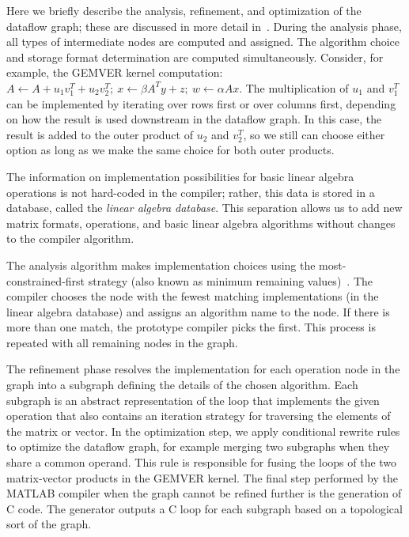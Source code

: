 \documentclass[runningheads]{llncs}
\begin{document}
Here we briefly describe the analysis, refinement, and optimization of the
dataflow graph; these are discussed in more detail in~\cite{Siek}. 
During the analysis phase, all types of intermediate nodes are computed and
assigned. The algorithm choice and storage format determination are computed
simultaneously.  Consider, for example, the GEMVER kernel computation:   
$A \gets A + u_1 v_1^T + u_2 v_2^T;~
  x \gets \beta A^T y + z;~
  w \gets \alpha A x$.
The multiplication of $u_1$ and $v_1^T$ can be implemented by iterating over 
rows first or over columns first, depending on how the result is used
downstream in the dataflow graph.  In this case, the result is added to the
outer product of $u_2$ and $v_2^T$, so we still can choose either option as
long as we make the same choice for both outer products.

The information on implementation possibilities for basic linear algebra
operations is not hard-coded in the compiler; rather, this data is stored
in a database, called the \emph{linear algebra database}.  This separation
allows us to add new matrix formats, operations, and basic linear algebra
algorithms without changes to the compiler algorithm.

The analysis algorithm makes implementation choices using the
most-con\-strained-first strategy (also known as minimum remaining
values)~\cite{Russell:2003mz}.  The compiler chooses the node with the fewest
matching implementations (in the linear algebra database) and assigns an
algorithm name to the node.  If there is more than one match, the prototype
compiler picks the first.  This process is repeated with all remaining nodes
in the graph.

The refinement phase resolves the implementation for each operation node in
the graph into a subgraph defining the details of the chosen algorithm.  Each
subgraph is an abstract representation of the loop that implements the given
operation that also contains an iteration strategy for traversing the
elements of the matrix or vector.
In the optimization step, we apply conditional rewrite rules to optimize the
dataflow graph, for example merging two subgraphs when they share a common
operand. This rule is responsible for fusing the loops of the two
matrix-vector products in the GEMVER kernel.  
The final step performed by the MATLAB compiler when the graph cannot be
refined further is the generation of C code. The generator outputs a C loop
for each subgraph based on a topological sort of the graph. 
\end{document}
